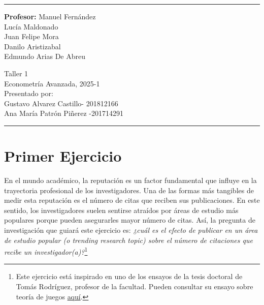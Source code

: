 \documentclass[a4paper, answers, addpoints, 11pt]{exam}
\begin{document}

\fancyhead[C]{}
\hrule \medskip 
\begin{minipage}{0.295\textwidth} 
\raggedright
\textbf{Profesor:} Manuel Fernández\\
\vspace{2mm}
Lucía Maldonado \\
Juan Felipe Mora \\
Danilo Aristizabal \\
Edmundo Arias De Abreu



\end{minipage}
\begin{minipage}{0.4\textwidth} 
\centering 
\huge 
Taller 1\\ 
\vspace{2mm}
\normalsize 
Econometría Avanzada, 2025-1\\ 
\vspace{2mm}
Presentado por: \\Gustavo Alvarez Castillo- 201812166\\
Ana María Patrón Piñerez -201714291

\end{minipage}

\medskip\hrule 
\bigskip

\section*{Primer Ejercicio}

En el mundo académico, la reputación es un factor fundamental que influye en la trayectoria profesional de los investigadores. Una de las formas más tangibles de medir esta reputación es el número de citas que reciben sus publicaciones. En este sentido, los investigadores suelen sentirse atraídos por áreas de estudio más populares porque pueden asegurarles mayor número de citas. Así, la pregunta de investigación que guiará este ejercicio es: \textit{¿cuál es el efecto de publicar en un área de estudio popular (o \textit{trending research topic}) sobre el número de citaciones que recibe un investigador(a)?}\footnote{Este ejercicio está inspirado en uno de los ensayos de la tesis doctoral de Tomás Rodríguez, profesor de la facultad. Pueden consultar su ensayo sobre teoría de juegos \href{https://stacks.stanford.edu/file/druid:wj208kq6898/Essays_on_Signaling_and_Social_Networks-augmented.pdf}{aquí}.} \\
\end{document}
